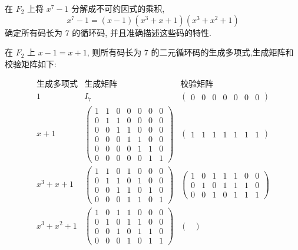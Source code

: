 \begin{exercise}
在 $ F_{2} $ 上将 $ x^{7}-1 $ 分解成不可约因式的乘积,
$$
x^{7}-1=(x-1)\left(x^{3}+x+1\right)\left(x^{3}+x^{2}+1\right)
$$
确定所有码长为 7 的循环码, 并且准确描述这些码的特性.
\end{exercise}
\begin{solution}
 在 $ F_{2} $ 上 $ x-1=x+1 $, 则所有码长为 7 的二元循环码的生成多项式,生成矩阵和校验矩阵如下:
 
 $$
 \begin{array}{|c|c|c|}
\hline
\text{生成多项式} & \text{生成矩阵} & \text{校验矩阵} \\
\hline
1 & I_7 &
\begin{pmatrix}
0 & 0 & 0 & 0 & 0 & 0 & 0
\end{pmatrix} \\
\hline
x + 1 &
\begin{pmatrix}
1 & 1 & 0 & 0 & 0 & 0 & 0 \\
0 & 1 & 1 & 0 & 0 & 0 & 0 \\
0 & 0 & 1 & 1 & 0 & 0 & 0 \\
0 & 0 & 0 & 1 & 1 & 0 & 0 \\
0 & 0 & 0 & 0 & 1 & 1 & 0 \\
0 & 0 & 0 & 0 & 0 & 1 & 1
\end{pmatrix} &
\begin{pmatrix}
1 & 1 & 1 & 1 & 1 & 1 & 1
\end{pmatrix} \\
\hline
x^3 + x + 1 &
\begin{pmatrix}
1 & 1 & 0 & 1 & 0 & 0 &0\\
0 & 1 & 1 & 0 & 1 & 0 &0\\
0 & 0 & 1 & 1 & 0 & 1&0\\
0 & 0&0 & 1 & 1 & 0 & 1
\end{pmatrix} &
\begin{pmatrix}
1 & 0 & 1 & 1 & 1 & 0 & 0 \\
0 & 1 & 0 & 1 & 1 & 1 & 0 \\
0 & 0 & 1 & 0 & 1 & 1 & 1
\end{pmatrix} \\
\hline
x^3 + x^2 + 1 &
\begin{pmatrix}
1 & 0 & 1 & 1 & 0 & 0 &0\\
0 & 1 & 0 & 1 & 1 & 0 &0\\
0 & 0 & 1 & 0 & 1 & 1&0\\
0&0 & 0 & 1 & 0 & 1 & 1
\end{pmatrix} &
\begin{pmatrix}

\end{pmatrix}
\end{array}$$
\end{solution}
